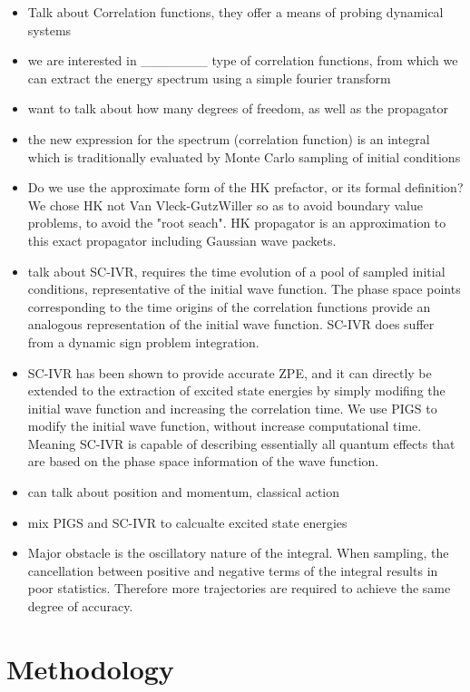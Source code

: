 \begin{itemize}
	\item Talk about Correlation functions, they offer a means of probing dynamical systems
	\item we are interested in \_\_\_\_\_\_\_ type of correlation functions, from which we can extract the energy spectrum using a simple fourier transform
	\item want to talk about how many degrees of freedom, as well as the propagator
	\item the new expression for the spectrum (correlation function) is an integral which is traditionally evaluated by Monte Carlo sampling of initial conditions
	\item Do we use the approximate form of the HK prefactor, or its formal definition? We chose HK not Van Vleck-GutzWiller so as to avoid boundary value problems, to avoid the "root seach". HK propagator is an approximation to this exact propagator including Gaussian wave packets.
	\item talk about SC-IVR, requires the time evolution of a pool of sampled initial conditions, representative of the initial wave function. The phase space points corresponding to the time origins of the correlation functions provide an analogous representation of the initial wave function. SC-IVR does suffer from a dynamic sign problem integration.
	\item SC-IVR has been shown to provide accurate ZPE, and it can directly be extended to the extraction of excited state energies by simply modifing the initial wave function and increasing the correlation time. We use PIGS to modify the initial wave function, without increase computational time. Meaning SC-IVR is capable of describing essentially all quantum effects that are based on the phase space information of the wave function.
	\item can talk about position and momentum, classical action
	\item mix PIGS and SC-IVR to calcualte excited state energies
	\item Major obstacle is the oscillatory nature of the integral. When sampling, the cancellation between positive and negative terms of the integral results in poor statistics. Therefore more trajectories are required to achieve the same degree of accuracy.
\end{itemize}

\section{Methodology}

